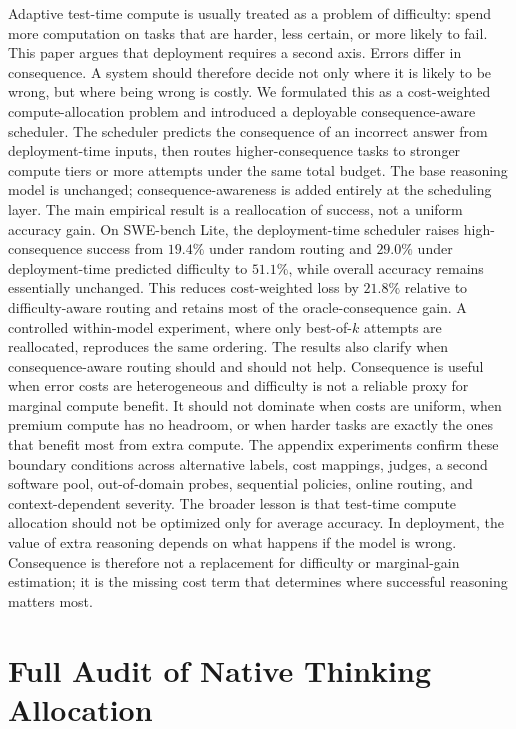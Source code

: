 \documentclass{article}
\begin{document}
Adaptive test-time compute is usually treated as a problem of
difficulty: spend more computation on tasks that are harder, less
certain, or more likely to fail. This paper argues that deployment
requires a second axis. Errors differ in consequence. A system should
therefore decide not only where it is likely to be wrong, but where
being wrong is costly.
We formulated this as a cost-weighted compute-allocation problem and
introduced a deployable consequence-aware scheduler. The scheduler
predicts the consequence of an incorrect answer from deployment-time
inputs, then routes higher-consequence tasks to stronger compute tiers
or more attempts under the same total budget. The base reasoning model
is unchanged; consequence-awareness is added entirely at the scheduling
layer.
The main empirical result is a reallocation of success, not a uniform
accuracy gain. On SWE-bench Lite, the deployment-time scheduler raises
high-consequence success from $19.4\%$ under random routing and
$29.0\%$ under deployment-time predicted difficulty to $51.1\%$,
while overall accuracy remains essentially unchanged. This reduces
cost-weighted loss by $21.8\%$ relative to difficulty-aware routing
and retains most of the oracle-consequence gain. A controlled
within-model experiment, where only best-of-$k$ attempts are
reallocated, reproduces the same ordering.
The results also clarify when consequence-aware routing should and
should not help. Consequence is useful when error costs are
heterogeneous and difficulty is not a reliable proxy for marginal
compute benefit. It should not dominate when costs are uniform, when
premium compute has no headroom, or when harder tasks are exactly the
ones that benefit most from extra compute. The appendix experiments
confirm these boundary conditions across alternative labels, cost
mappings, judges, a second software pool, out-of-domain probes,
sequential policies, online routing, and context-dependent severity.
The broader lesson is that test-time compute allocation should not be
optimized only for average accuracy. In deployment, the value of extra
reasoning depends on what happens if the model is wrong. Consequence is
therefore not a replacement for difficulty or marginal-gain estimation;
it is the missing cost term that determines where successful reasoning
matters most.




\appendix

\section{Full Audit of Native Thinking Allocation}
\label{app:audit}
\end{document}
